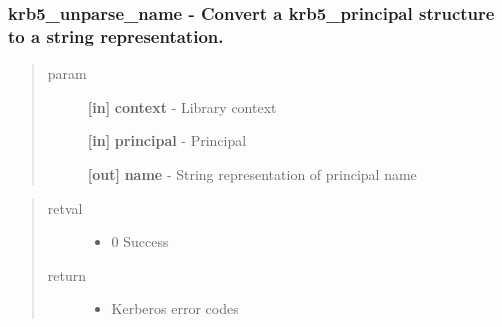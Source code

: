 \documentclass[letterpaper,10pt,english]{sphinxmanual}
\begin{document}
\subsubsection{krb5\_unparse\_name -  Convert a krb5\_principal structure to a string representation.}
\label{appdev/refs/api/krb5_unparse_name:krb5-unparse-name-convert-a-krb5-principal-structure-to-a-string-representation}\label{appdev/refs/api/krb5_unparse_name::doc}

\begin{fulllineitems}
\label{appdev/refs/api/krb5_unparse_name:c.krb5_unparse_name}
\end{fulllineitems}

\begin{quote}\begin{description}
\item[{param}] \leavevmode
\textbf{{[}in{]}} \textbf{context} - Library context

\textbf{{[}in{]}} \textbf{principal} - Principal

\textbf{{[}out{]}} \textbf{name} - String representation of principal name

\end{description}\end{quote}
\begin{quote}\begin{description}
\item[{retval}] \leavevmode\begin{itemize}
\item {} 
0   Success

\end{itemize}

\item[{return}] \leavevmode\begin{itemize}
\item {} 
Kerberos error codes

\end{itemize}

\end{description}\end{quote}
\end{document}
